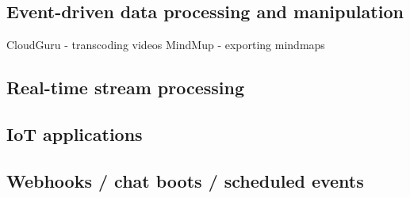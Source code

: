 \subsection*{Event-driven data processing and manipulation}


CloudGuru - transcoding videos
MindMup - exporting mindmaps


\subsection*{Real-time stream processing}

\subsection*{IoT applications}

\subsection*{Webhooks / chat boots / scheduled events}

